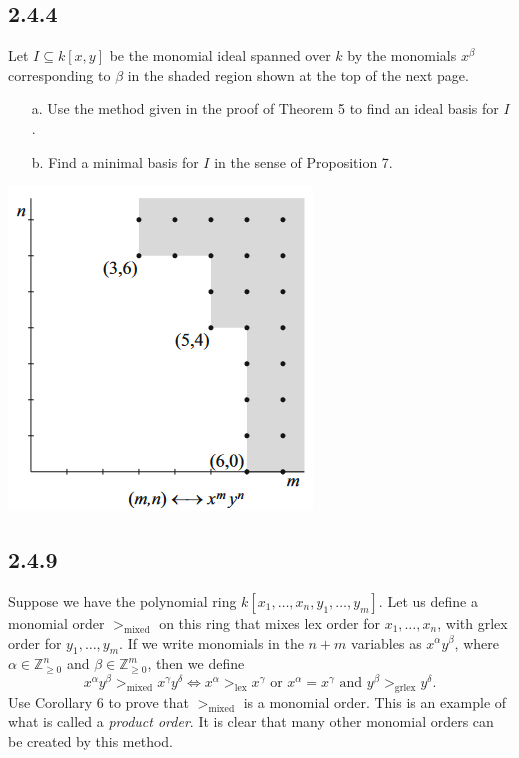 \documentclass[]{article}
\newcommand\<{\langle}
\renewcommand\>{\rangle}
\newcommand{\ZZ}{\ensuremath{\mathbb{Z}}}
\begin{document}
\subsection*{2.4.4} Let $I \subseteq k[x,y]$ be the monomial ideal spanned over $k$ by the monomials $x^\beta$ corresponding to $\beta$ in the shaded region shown at the top of the next page.
\begin{enumerate}
	\item[a.] Use the method given in the proof of Theorem 5 to find an ideal basis for $I$.
	\item[b.] Find a minimal basis for $I$ in the sense of Proposition 7.
\end{enumerate}
\begin{center}
	\includegraphics{2-4-4.png}
\end{center}

\subsection*{2.4.9} Suppose we have the polynomial ring $k[x_1,\dots,x_n,y_1,\dots,y_m]$. Let us define a monomial order $>_\text{mixed}$ on this ring that mixes lex order for $x_1,\dots,x_n$, with grlex order for $y_1,\dots,y_m$. If we write monomials in the $n + m$ variables as $x^{\alpha}y^{\beta}$, where $\alpha \in \ZZ_{\geq 0}^n$ and $\beta \in \ZZ_{\geq 0}^{m}$, then we define
$$
	x^{\alpha}y^{\beta} >_{\text{mixed}} x^{\gamma}y^{\delta} \iff x^{\alpha} >_{\text{lex}} x^{\gamma} \text{ or } x^{\alpha} = x^{\gamma} \text{ and } y^{\beta} >_{\text{grlex}}y^\delta.
$$
Use Corollary 6 to prove that $>_\text{mixed}$ is a monomial order. This is an example of what is called a \textit{product order}. It is clear that many other monomial orders can be created by this method.
\end{document}
